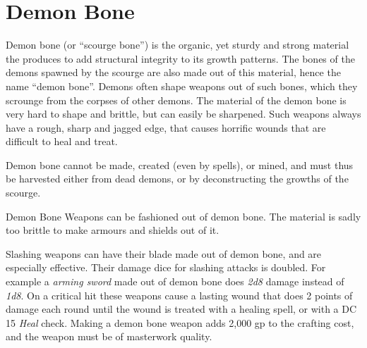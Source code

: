 \section{Demon Bone}
\label{sec:Demon Bone}

Demon bone (or ``scourge bone'') is the organic, yet sturdy and strong
material the  produces to add structural integrity to its
growth patterns. The bones of the demons spawned by the scourge are also made
out of this material, hence the name ``demon bone''. Demons often shape
weapons out of such bones, which they scrounge from the corpses of other
demons. The material of the demon bone is very hard to shape and brittle, but
can easily be sharpened. Such weapons always have a rough, sharp and jagged
edge, that causes horrific wounds that are difficult to heal and treat.

Demon bone cannot be made, created (even by spells), or mined, and must thus
be harvested either from dead demons, or by deconstructing the growths of the
scourge.

\begin{35e}{Demon Bone}
  Weapons can be fashioned out of demon bone. The material is sadly too brittle
  to make armours and shields out of it.

  Slashing weapons can have their blade made out of demon bone, and are
  especially effective. Their damage dice for slashing attacks is doubled. For
  example a \emph{arming sword} made out of demon bone does \emph{2d8} damage
  instead of \emph{1d8}. On a critical hit these weapons cause a lasting wound
  that does 2 points of damage each round until the wound is treated with a
  healing spell, or with a DC 15 \emph{Heal} check. Making a demon bone weapon
  adds 2,000 gp to the crafting cost, and the weapon must be of masterwork
  quality.
\end{35e}
